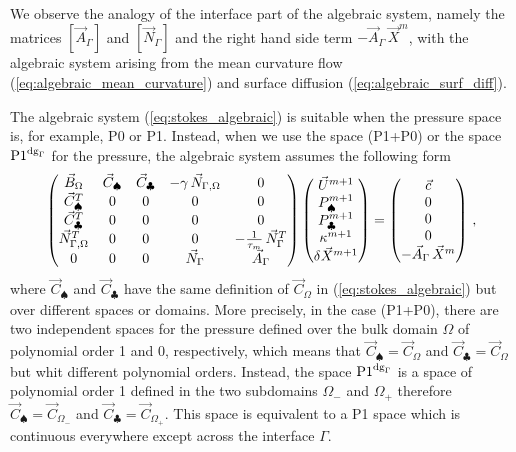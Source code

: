 We observe the analogy of the interface part of the algebraic system,
namely the matrices $[\vec{A}_\Gamma]$ and $[\vec{N}_\Gamma]$ and the right
hand side term $-\vec{A}_\Gamma\,\vec X^m$, with the algebraic system arising
from the mean curvature flow (\ref{eq:algebraic_mean_curvature}) and surface
diffusion (\ref{eq:algebraic_surf_diff}).

The algebraic system (\ref{eq:stokes_algebraic}) is suitable when the pressure
space is, for example, P0 or P1. Instead, when we use the space (P1+P0) or the
space ${\rm P1}^{{\rm dg}_\Gamma}$ for the pressure, the algebraic system assumes the following form
\begin{equation}
\begin{pmatrix}
\vec B_\Omega & \vec C_{\spadesuit} & \vec C_{\clubsuit} & -\gamma\,\vec{N}_{\Gamma,\Omega} & 0\\
\vec C^T_{\spadesuit} & 0 & 0 & 0 & 0 \\
\vec C^T_{\clubsuit} & 0 & 0 & 0 & 0 \\
\vec{N}_{\Gamma,\Omega}^T & 0 & 0 & 0 & -\frac1{\tau_m}\,\vec{N}_\Gamma^T \\
0 & 0 & 0 & \vec{N}_\Gamma & \vec{A}_\Gamma
\end{pmatrix}
\begin{pmatrix}
\vec U^{m+1} \\
P^{m+1}_\spadesuit \\
P^{m+1}_\clubsuit \\
\kappa^{m+1} \\
\delta\vec{X}^{m+1}
\end{pmatrix}
=
\begin{pmatrix}
\vec c \\
0 \\
0 \\
0 \\
-\vec{A}_\Gamma\,\vec{X}^{m}
\end{pmatrix} \,,
\label{eq:stokes_algebraic_extended}
\end{equation}
where $\vec C_{\spadesuit}$ and $\vec C_{\clubsuit}$ have the same definition
of $\vec C_\Omega$ in (\ref{eq:stokes_algebraic}) but over different spaces or
domains. More precisely, in the case (P1+P0), there are two independent spaces
for the pressure defined over the bulk domain $\Omega$ of polynomial order 1 and
0, respectively, which means that $\vec C_{\spadesuit}=\vec C_\Omega$ and
$\vec C_{\clubsuit}=\vec C_\Omega$ but whit different polynomial orders.
Instead, the space ${\rm P1}^{{\rm dg}_\Gamma}$ is a space of polynomial order 1 defined in the two
subdomains $\Omega_-$ and $\Omega_+$ therefore $\vec C_{\spadesuit}=\vec
C_{\Omega_-}$ and $\vec C_{\clubsuit}=\vec C_{\Omega_+}$. This space is
equivalent to a P1 space which is continuous everywhere except across the
interface $\Gamma$.

